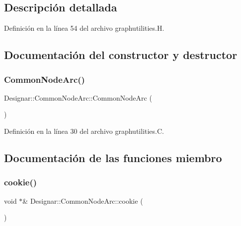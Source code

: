 \subsection{Descripción detallada}


Definición en la línea 54 del archivo graphutilities.\+H.



\subsection{Documentación del constructor y destructor}
\mbox{\label{class_designar_1_1_common_node_arc_a7b0794f171cc8ad5b5e4c28216366c53}} 
\subsubsection{\texorpdfstring{Common\+Node\+Arc()}{CommonNodeArc()}}
{\footnotesize\ttfamily Designar\+::\+Common\+Node\+Arc\+::\+Common\+Node\+Arc (\begin{DoxyParamCaption}{ }\end{DoxyParamCaption})}



Definición en la línea 30 del archivo graphutilities.\+C.



\subsection{Documentación de las funciones miembro}
\mbox{\label{class_designar_1_1_common_node_arc_a385a91e2bddd8a6f69d418b36b2cf11e}} 
\subsubsection{\texorpdfstring{cookie()}{cookie()}}
{\footnotesize\ttfamily void $\ast$\& Designar\+::\+Common\+Node\+Arc\+::cookie (\begin{DoxyParamCaption}{ }\end{DoxyParamCaption})}




